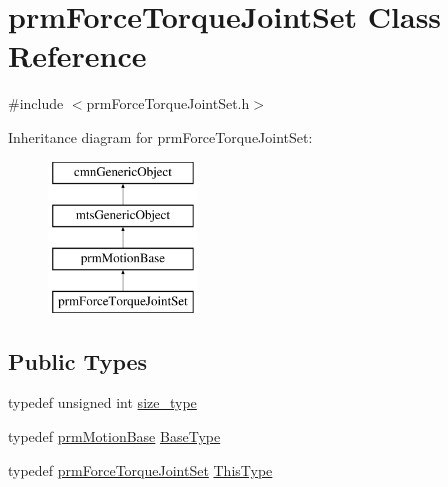 \hypertarget{classprm_force_torque_joint_set}{\section{prm\-Force\-Torque\-Joint\-Set Class Reference}
\label{classprm_force_torque_joint_set}
}


{\ttfamily \#include $<$prm\-Force\-Torque\-Joint\-Set.\-h$>$}

Inheritance diagram for prm\-Force\-Torque\-Joint\-Set\-:\begin{figure}[H]
\begin{center}
\leavevmode
\includegraphics[height=4.000000cm]{da/d22/classprm_force_torque_joint_set}
\end{center}
\end{figure}
\subsection*{Public Types}
\begin{DoxyCompactItemize}
\item 
typedef unsigned int \hyperlink{classprm_force_torque_joint_set_a2fa9d363f410074de832a3f627f3b43b}{size\-\_\-type}
\item 
typedef \hyperlink{classprm_motion_base}{prm\-Motion\-Base} \hyperlink{classprm_force_torque_joint_set_a5381a0507902adc394509c016450ad79}{Base\-Type}
\item 
typedef \hyperlink{classprm_force_torque_joint_set}{prm\-Force\-Torque\-Joint\-Set} \hyperlink{classprm_force_torque_joint_set_a18867cb10dfae15004f3c72b30481f20}{This\-Type}
\end{DoxyCompactItemize}
